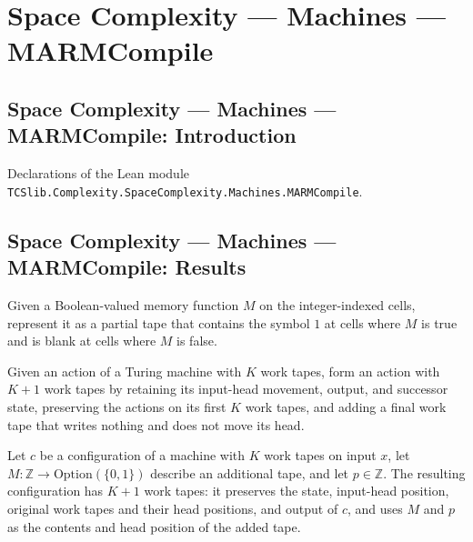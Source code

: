 \section{Space Complexity --- Machines --- MARMCompile}
\subsection*{Space Complexity --- Machines --- MARMCompile: Introduction}

Declarations of the Lean module \texttt{TCSlib.Complexity.SpaceComplexity.Machines.MARMCompile}.

\subsection*{Space Complexity --- Machines --- MARMCompile: Results}

\begin{definition}
\label{Complexity.LogProg.memTape}
\leanok
Given a Boolean-valued memory function $M$ on the integer-indexed cells, represent it as
a partial tape that contains the symbol $1$ at cells where $M$ is true and is blank at
cells where $M$ is false.
\end{definition}

\begin{definition}
\label{Complexity.LogProg.liftAct}
\leanok
{}
Given an action of a Turing machine with $K$ work tapes, form an action with $K+1$ work
tapes by retaining its input-head movement, output, and successor state, preserving the
actions on its first $K$ work tapes, and adding a final work tape that writes nothing
and does not move its head.
\end{definition}

\begin{definition}
\label{Complexity.LogProg.memCfg}
\leanok
{}
Let $c$ be a configuration of a machine with $K$ work tapes on input $x$, let
$M\colon\mathbb Z\to\mathrm{Option}(\{0,1\})$ describe an additional tape, and let
$p\in\mathbb Z$. The resulting configuration has $K+1$ work tapes: it preserves the
state, input-head position, original work tapes and their head positions, and output of
$c$, and uses $M$ and $p$ as the contents and head position of the added tape.
\end{definition}


